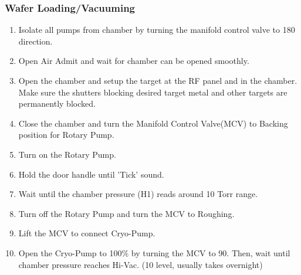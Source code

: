 \subsubsection{Wafer Loading/Vacuuming}
\label{Edwards:Loading}
\begin{enumerate}
\item Isolate all pumps from chamber by turning the manifold control valve to 180 direction.
\item Open Air Admit and wait for chamber can be opened smoothly.
\item Open the chamber and setup the target at the RF panel and in the chamber. Make sure the shutters blocking desired target metal and other targets are permanently blocked.
\item Close the chamber and turn the Manifold Control Valve(MCV) to Backing position for Rotary Pump.
\item Turn on the Rotary Pump.  
\item Hold the door handle until 'Tick' sound.
\item Wait until the chamber pressure (H1) reads around 10 Torr range.
\item Turn off the Rotary Pump and turn the MCV to Roughing.
\item Lift the MCV to connect Cryo-Pump.
\item Open the Cryo-Pump to 100\% by turning the MCV to 90. Then, wait until chamber pressure reaches Hi-Vac. (10 level, usually takes overnight)
\end{enumerate}

